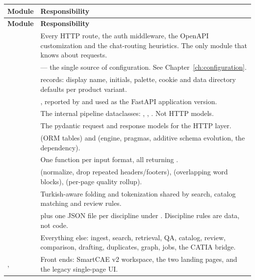 \begin{longtable}{L{0.28\textwidth} L{0.62\textwidth}}
\toprule
\textbf{Module} & \textbf{Responsibility} \\
\midrule
\endfirsthead
\toprule
\textbf{Module} & \textbf{Responsibility} \\
\midrule
\endhead
\bottomrule
\endfoot
{} & Every HTTP route, the auth middleware, the OpenAPI
customization and the chat-routing heuristics. The only module that knows about
requests. \\
 &  --- the single source of configuration.
See Chapter~\ref{ch:configuration}. \\
 &  records: display name, initials,
palette, cookie and data directory defaults per product variant. \\
 & , reported by  and used
as the FastAPI application version. \\
 & The internal pipeline dataclasses:
, , . Not HTTP
models. \\
 & The pydantic request and response models for the
HTTP layer. \\
 &  (ORM tables) and  (engine,
pragmas, additive schema evolution, the  dependency). \\
 & One function per input format, all returning
. \\
 &  (normalize, drop repeated
headers/footers),  (overlapping word blocks),
 (per-page quality rollup). \\
 & Turkish-aware folding and tokenization shared by
search, catalog matching and review rules. \\
 &  plus one JSON file per discipline
under . Discipline rules are data, not code. \\
 & Everything else: ingest, search, retrieval, QA, catalog,
review, comparison, drafting, duplicates, graph, jobs, the CATIA bridge. \\
,  & Front ends: SmartCAE v2 workspace, the two
landing pages, and the legacy single-page UI. \\
\end{longtable}

